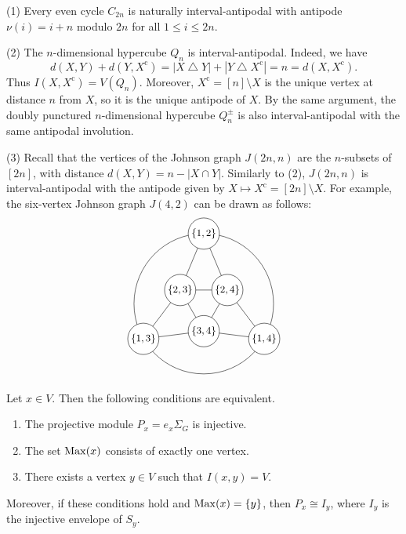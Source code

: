 \documentclass[a4paper,leqno]{amsart}
\begin{document}
\begin{eg}\label{ex:interval-antipodals}
(1) Every even cycle $C_{2n}$ is naturally interval-antipodal with antipode $\nu(i) = i+n$ modulo $2n$ for all $1\le i\le 2n$.

(2) The $n$-dimensional hypercube $Q_n$ is interval-antipodal.  Indeed, we have
$$d(X,Y)+d(Y,X^{\mathrm c})
=|X\mathbin{\triangle}Y|
 +|Y\mathbin{\triangle}X^{\mathrm c}|
=n=d(X,X^{\mathrm c}).$$
Thus $I(X,X^{\mathrm c})=V(Q_n)$. Moreover, $X^{\mathrm c}=[n]\setminus X$ is the unique vertex at distance $n$ from $X$, so it is the unique antipode of $X$.
By the same argument, the doubly punctured $n$-dimensional hypercube $Q_n^{\pm}$ is also interval-antipodal with the same antipodal involution.

(3) Recall that the vertices of the Johnson graph $J(2n,n)$ are the $n$-subsets of $[2n]$, with distance $d(X,Y)=n-|X\cap Y|$.  Similarly to (2), $J(2n,n)$ is interval-antipodal with the antipode given by $X\mapsto X^{\mathrm c}=[2n]\setminus X$.  For example, the six-vertex Johnson graph $J(4,2)$ can be drawn as follows:
\[
\begin{tikzpicture}[
    scale=0.70,
    vertex/.style={
        circle,
        draw,
        fill=white,
        minimum size=10mm,
        inner sep=1pt,
        outer sep=0pt,
        font=\small
    }
]
\draw (0,0) circle[radius=3.2];

\node[vertex] (v12) at (90:3.2)  {$\{1,2\}$};
\node[vertex] (v13) at (210:3.2) {$\{1,3\}$};
\node[vertex] (v14) at (330:3.2) {$\{1,4\}$};

\node[vertex] (v34) at (270:1.25) {$\{3,4\}$};
\node[vertex] (v24) at (30:1.25)  {$\{2,4\}$};
\node[vertex] (v23) at (150:1.25) {$\{2,3\}$};

\draw (v23) -- (v24);
\draw (v24) -- (v34);
\draw (v34) -- (v23);

\draw (v12) -- (v23);
\draw (v12) -- (v24);

\draw (v13) -- (v23);
\draw (v13) -- (v34);

\draw (v14) -- (v24);
\draw (v14) -- (v34);
\end{tikzpicture}
\]
\end{eg}

\begin{lem}\label{lem:proj-inj-max}
Let $x\in V$. Then the following conditions are equivalent.
\begin{enumerate}
\item The projective module $P_x=e_x\Sigma_G$ is injective.
\item The set $\operatorname{Max}(x)$ consists of exactly one vertex.
\item There exists a vertex $y\in V$ such that $I(x,y)=V$.
\end{enumerate}
Moreover, if these conditions hold and $\operatorname{Max}(x)=\{y\}$, then
$P_x\cong I_y$, where $I_y$ is the injective envelope of $S_y$.
\end{lem}
\end{document}
